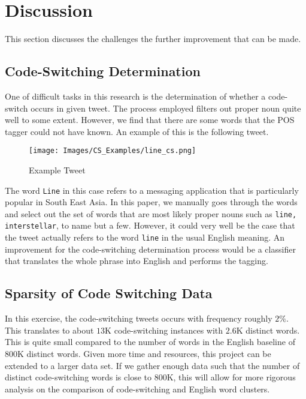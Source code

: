 \documentclass[conference]{IEEEtran}
\begin{document}
\newpage
\section{Discussion}
This section discusses the challenges the further improvement that can be made. 
\subsection{Code-Switching Determination}
One of  difficult tasks in this research is the determination of whether a code-switch occurs in given tweet. 
The process employed filters out proper noun  quite well to some extent. However, we find that there are some words that the POS tagger could not have known. An example of this is the following tweet. 


\begin{figure}[H]
	\centering
	\texttt{[image: Images/CS\_Examples/line\_cs.png]}
	\caption{Example Tweet}
	\label{fig:GS_compare_column_alpha}
\end{figure}

The word {\tt Line} in this case refers to a messaging application that is particularly popular in South East Asia. In this paper, we manually goes through the words and select out the set of words that are most likely proper nouns such as {\tt line, interstellar}, to name but a few. However, it could very well be the case that the tweet actually refers to the word {\tt line} in the usual English meaning.  An improvement for the code-switching determination process would be a classifier that translates the whole phrase into English and performs the tagging. 


\subsection{Sparsity of Code Switching Data}
In this exercise, the  code-switching tweets occurs with frequency roughly $2 \% $. This translates to about $13$K code-switching instances with $2.6$K distinct words. This is quite small compared to the number of words in the English baseline of $800$K distinct words. Given more time and resources, this project can be extended to a larger data set. If we gather enough data such that the number of distinct code-switching words is close to $800$K, this will allow for more rigorous analysis on the comparison of code-switching and English word clusters. 
\end{document}
